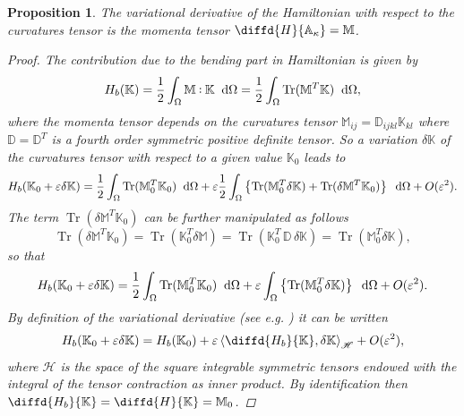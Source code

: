 \documentclass[preprint,12pt]{elsarticle}
\DeclareMathOperator{\Tr}{Tr}
\newtheorem{proposition}{Proposition}
\def\onedot{$\mathsurround0pt\ldotp$}
\def\cddot{%
	\mathbin{\vcenter{\baselineskip.67ex
			\hbox{\onedot}\hbox{\onedot}}%
}}
\begin{document}
\begin{proposition}
	The variational derivative of the Hamiltonian with respect to the curvatures tensor is the momenta tensor $\diffd{H}{\mathbb{A}_{\kappa}} = \mathbb{M}$.
	\begin{proof}
		The contribution due to the bending part in Hamiltonian is given by 
		\[H_b(\mathbb{K}) = \frac{1}{2} \int_{\Omega}  \mathbb{M} \cddot \mathbb{K} \; \d\Omega = \frac{1}{2} \int_{\Omega} \Tr(\mathbb{M}^T \mathbb{K}) \; \d\Omega, \]
		where the momenta tensor depends on the curvatures tensor $\mathbb{M}_{ij} = \mathbb{D}_{ijkl}\mathbb{K}_{kl} $ where $\mathbb{D} = \mathbb{D}^T$ is a fourth order symmetric positive definite tensor.
		So a variation $\delta\mathbb{K}$ of the curvatures tensor with respect to a given value $\mathbb{K}_0$ leads to
		\[H_b(\mathbb{K}_0+ \varepsilon \delta\mathbb{K}) = \frac{1}{2} \int_{\Omega} \Tr(\mathbb{M}_0^T \mathbb{K}_0) \; \d\Omega + \varepsilon \frac{1}{2} \int_{\Omega} \left\{ \Tr(\mathbb{M}_0^T \delta\mathbb{K}) + \Tr(\delta\mathbb{M}^T \mathbb{K}_0)\right\}\; \d\Omega  + O(\varepsilon^2). \]
		The term $\Tr(\delta\mathbb{M}^T \mathbb{K}_0)$ can be further manipulated as follows 
		\[ \Tr(\delta\mathbb{M}^T \mathbb{K}_0) = \Tr(\mathbb{K}_0^T \delta\mathbb{M}) = \Tr(\mathbb{K}_0^T \, \mathbb{D} \, \delta\mathbb{K}) = \Tr(\mathbb{M}_0^T \delta\mathbb{K}),
		\]
		 so that 
		\[H_b(\mathbb{K}_0+ \varepsilon \delta\mathbb{K}) = \frac{1}{2} \int_{\Omega} \Tr(\mathbb{M}_0^T \mathbb{K}_0) \; \d\Omega + \varepsilon \int_{\Omega} \left\{ \Tr(\mathbb{M}_0^T \delta\mathbb{K})\right\}\; \d\Omega  + O(\varepsilon^2). \]
		By definition of the variational derivative (see e.g. \cite{VANDERSCHAFT2002166}) it can be written
		\[H_b(\mathbb{K}_0+ \varepsilon \delta\mathbb{K}) = H_b(\mathbb{K}_0) + \varepsilon \left\langle \diffd{H_b}{\mathbb{K}} , \delta\mathbb{K}  \right\rangle_{\mathscr{H}} + O(\varepsilon^2), \]
		where $\mathscr{H}$ is the space of the square integrable symmetric tensors endowed with the integral of the tensor contraction as inner product. By identification then $\diffd{H_b}{\mathbb{K}} = \diffd{H}{\mathbb{K}} = \mathbb{M}_0$.
	\end{proof}
\end{proposition}
\end{document}

